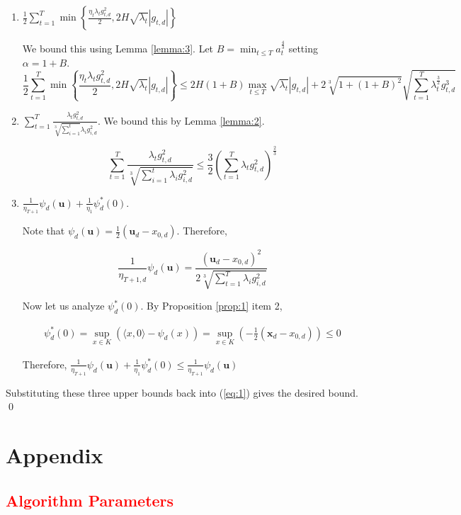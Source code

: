 \documentclass{article}
\newcommand{\bx}{\mathbf{x}}
\newcommand{\bu}{\mathbf{u}}
\newcommand{\todo}[1]{\textcolor{red}{#1}}
\begin{document}
\begin{enumerate}
\item $\frac{1}{2}\sum\limits_{t=1}^T \min \left\{\frac{\eta_t \lambda_t g_{t,d}^2}{2}, 2H\sqrt{\lambda_t}|g_{t,d}|\right\}$

  We bound this using Lemma \ref{lemma:3}. Let $B = \min_{t\leq T}a_{t}^\frac{4}{3}$ setting $\alpha = 1+B$.
  \[
    \frac{1}{2}\sum\limits_{t=1}^T \min \left\{\frac{\eta_t \lambda_t g_{t,d}^2}{2}, 2H\sqrt{\lambda_t}|g_{t,d}|\right\}
    \leq 2H(1+B)\max_{t\leq T}\sqrt{\lambda_t}|g_{t,d}| +
    2\sqrt[3]{1 + (1+B)^2}\sqrt{\sum\limits_{t=1}^T \lambda_{t}^\frac{3}{2} g_{t,d}^3}
  \]
\item $\sum\limits_{t=1}^T \frac{\lambda_t g_{t,d}^2}{\sqrt[3]{\sum\limits_{i=1}^t}\lambda_i g_{i,d}^2}$. We bound this
  by Lemma \ref{lemma:2}.

  \[
    \sum\limits_{t=1}^T \frac{\lambda_t g_{t,d}^2}{\sqrt[3]{\sum\limits_{i=1}^t\lambda_i g_{i,d}^2}} \leq \frac{3}{2}
    \left(\sum\limits_{t=1}^T \lambda_t g_{t,d}^2\right)^\frac{2}{3}
  \]
\item $\frac{1}{\eta_{T+1}}\psi_{d}(\bu) + \frac{1}{\eta_1}\psi_{d}^*(0)$.

  Note that $\psi_d(\bu) = \frac{1}{2}(\bu_d - x_{0,d})$. Therefore,

  \[
    \frac{1}{\eta_{T+1,d}}\psi_d(\bu) = \frac{(\bu_d - x_{0,d})^2}{2 \sqrt[3]{\sum\limits_{t=1}^T \lambda_i g_{i,d}^2}}
  \]

  Now let us analyze $\psi_d^*(0)$. By Proposition \ref{prop:1} item 2,

  \begin{align*}
    \psi_d^*(0) = \sup\limits_{x \in K}(\langle x , 0 \rangle - \psi_d(x)) = \sup_{x \in K}(-\frac{1}{2}(\bx_d -
    x_{0,d})) \leq 0
  \end{align*}

  Therefore, $\frac{1}{\eta_{T+1}}\psi_{d}(\bu) + \frac{1}{\eta_1}\psi_{d}^*(0) \leq \frac{1}{\eta_{T+1}}\psi_{d}(\bu)$
\end{enumerate}

Substituting these three upper bounds back into (\ref{eq:1}) gives the desired bound. \\
\qed




\appendix
\section{Appendix}
\todo{\subsection{Algorithm Parameters}}\label{algoparams}
\end{document}
